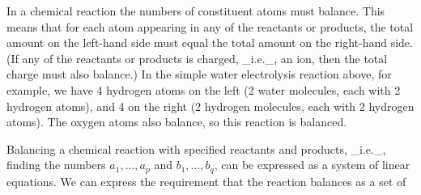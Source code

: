 In a chemical reaction the numbers of constituent atoms must balance. This means that for each atom appearing in any of the reactants or products, the total amount on the left-hand side must equal the total amount on the right-hand side. (If any of the reactants or products is charged, _i.e._, an ion, then the total charge must also balance.) In the simple water electrolysis reaction above, for example, we have 4 hydrogen atoms on the left (2 water molecules, each with 2 hydrogen atoms), and 4 on the right (2 hydrogen molecules, each with 2 hydrogen atoms). The oxygen atoms also balance, so this reaction is balanced.

Balancing a chemical reaction with specified reactants and products, _i.e._, finding the numbers \(a_{1},\ldots,a_{p}\) and \(b_{1},\ldots,b_{q}\), can be expressed as a system of linear equations. We can express the requirement that the reaction balances as a set of
